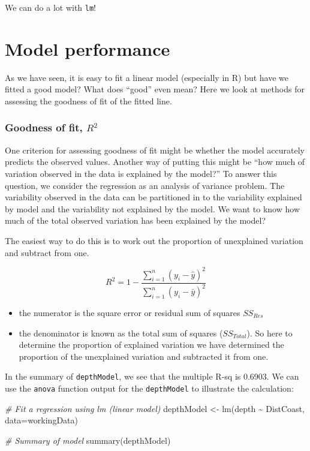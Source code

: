 \documentclass[
  oneside]{krantz}
\newenvironment{Shaded}{\begin{snugshade}}{\end{snugshade}}
\newcommand{\AttributeTok}[1]{\textcolor[rgb]{0.77,0.63,0.00}{#1}}
\newcommand{\CommentTok}[1]{\textcolor[rgb]{0.56,0.35,0.01}{\textit{#1}}}
\newcommand{\FunctionTok}[1]{\textcolor[rgb]{0.00,0.00,0.00}{#1}}
\newcommand{\NormalTok}[1]{#1}
\newcommand{\OtherTok}[1]{\textcolor[rgb]{0.56,0.35,0.01}{#1}}
\newcommand{\SpecialCharTok}[1]{\textcolor[rgb]{0.00,0.00,0.00}{#1}}
\providecommand{\tightlist}{%
  \setlength{\itemsep}{0pt}\setlength{\parskip}{0pt}}
\begin{document}
We can do a lot with \texttt{lm}!

\hypertarget{model-performance}{%
\section{Model performance}\label{model-performance}}

As we have seen, it is easy to fit a linear model (especially in R) but have we fitted a good model? What does ``good'' even mean? Here we look at methods for assessing the goodness of fit of the fitted line.

\hypertarget{goodness-of-fit-r2}{%
\subsubsection{\texorpdfstring{Goodness of fit, \(R^2\)}{Goodness of fit, R\^{}2}}\label{goodness-of-fit-r2}}

One criterion for assessing goodness of fit might be whether the model accurately predicts the observed values. Another way of putting this might be ``how much of variation observed in the data is explained by the model?'' To answer this question, we consider the regression as an analysis of variance problem. The variability observed in the data can be partitioned in to the variability explained by model and the variability not explained by the model. We want to know how much of the total observed variation has been explained by the model?

The easiest way to do this is to work out the proportion of unexplained variation and subtract from one.

\[R^2=1- \frac{\sum_{i=1}^{n}(y_i-\hat{y})^2}{\sum_{i=1}^{n}(y_i-\bar{y})^2}\]

\begin{itemize}
\tightlist
\item
  the numerator is the square error or residual sum of squares \(SS_{Res}\)
\item
  the denominator is known as the total sum of squares (\(SS_{Total}\)).
  So here to determine the proportion of explained variation we have determined the proportion of the unexplained variation and subtracted it from one.
\end{itemize}

In the summary of \texttt{depthModel}, we see that the multiple R-sq is 0.6903. We can use the \texttt{anova} function output for the \texttt{depthModel} to illustrate the calculation:

\begin{Shaded}
\begin{Highlighting}[]
\CommentTok{\# Fit a regression using lm (linear model)}
\NormalTok{depthModel }\OtherTok{\textless{}{-}} \FunctionTok{lm}\NormalTok{(depth }\SpecialCharTok{\textasciitilde{}}\NormalTok{ DistCoast,  }\AttributeTok{data=}\NormalTok{workingData)}

\CommentTok{\# Summary of model}
\FunctionTok{summary}\NormalTok{(depthModel)}
\end{Highlighting}
\end{Shaded}
\end{document}

